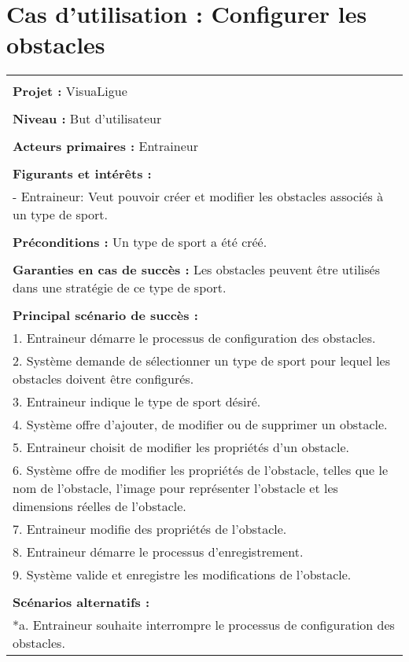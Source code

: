 \section{Cas d'utilisation : Configurer les obstacles}
\begin{longtable}{|p{16cm}|}
	\hline
	\\
	\textbf{Projet :} VisuaLigue\\
	\\
	\textbf{Niveau :} But d'utilisateur\\
	\\
	\textbf{Acteurs primaires :} Entraineur\\
	\\
	\textbf{Figurants et intérêts :} \\
	- Entraineur: Veut pouvoir créer et modifier les obstacles associés à un type de sport.\\
	\\
	\textbf{Préconditions :} Un type de sport a été créé.\\
	\\
	\textbf{Garanties en cas de succès :} Les obstacles peuvent être utilisés dans une stratégie de ce type de sport.\\
	\\
	\textbf{Principal scénario de succès :}\\
	1. Entraineur démarre le processus de configuration des obstacles.\\
	2. Système demande de sélectionner un type de sport pour lequel les obstacles doivent être configurés.\\
	3. Entraineur indique le type de sport désiré.\\
	4. Système offre d'ajouter, de modifier ou de supprimer un obstacle.\\
	5. Entraineur choisit de modifier les propriétés d'un obstacle.\\
	6. Système offre de modifier les propriétés de l'obstacle, telles que le nom de l'obstacle, l'image pour représenter l'obstacle et les dimensions réelles de l'obstacle.\\
	7. Entraineur modifie des propriétés de l'obstacle.\\
	8. Entraineur démarre le processus d'enregistrement.\\
	9. Système valide et enregistre les modifications de l'obstacle.\\
	\\
	\textbf{Scénarios alternatifs :}\\
	*a. Entraineur souhaite interrompre le processus de configuration des obstacles.\\

\end{longtable}

